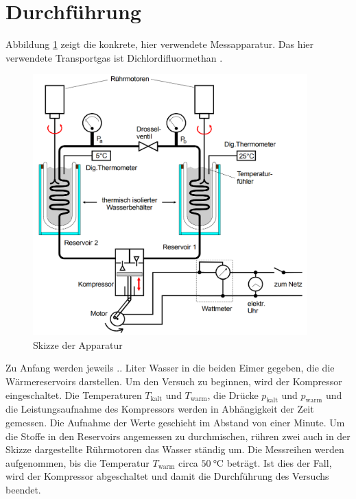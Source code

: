 \section{Durchführung}
\label{sec:Durchführung}
Abbildung \ref{fig:waermepumpebildkonkret} zeigt die konkrete, hier verwendete
Messapparatur. Das hier verwendete Transportgas ist Dichlordifluormethan
.
\begin{figure}
  \centering
  \includegraphics[width=300pt]{data/waermepumpekonkret.png}
  \caption{Skizze der Apparatur \cite{Versuchsanleitung}}
  \label{fig:waermepumpebildkonkret}
\end{figure}
Zu Anfang werden jeweils .. Liter Wasser in die beiden Eimer gegeben, die die
Wärmereservoirs darstellen. Um den Versuch zu beginnen, wird der Kompressor eingeschaltet.
Die Temperaturen $T_\text{kalt}$ und $T_\text{warm}$, die Drücke $p_\text{kalt}$
und $p_\text{warm}$ und die Leistungsaufnahme des Kompressors werden in Abhängigkeit der
Zeit gemessen. Die Aufnahme der Werte geschieht im Abstand von einer Minute. Um die
Stoffe in den Reservoirs angemessen zu durchmischen, rühren zwei auch in der Skizze dargestellte
Rührmotoren das Wasser ständig um. Die Messreihen werden aufgenommen, bis die Temperatur
$T_\text{warm}$ circa $\SI{50}{\celsius}$ beträgt. Ist dies der Fall, wird der Kompressor
abgeschaltet und damit die Durchführung des Versuchs beendet.
